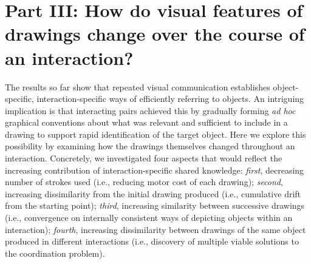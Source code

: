 \documentclass[10pt,letterpaper]{article}
\begin{document}






\section{Part III: How do visual features of drawings change over the course of an interaction?}

The results so far show that repeated visual communication establishes object-specific, interaction-specific ways of efficiently referring to objects.
An intriguing implication is that interacting pairs achieved this by gradually forming \textit{ad hoc} graphical conventions about what was relevant and sufficient to include in a drawing to support rapid identification of the target object.
Here we explore this possibility by examining how the drawings themselves changed throughout an interaction.
Concretely, we investigated four aspects that would reflect the increasing contribution of interaction-specific shared knowledge:
\textit{first}, decreasing number of strokes used (i.e., reducing motor cost of each drawing);
\textit{second}, increasing dissimilarity from the initial drawing produced (i.e., cumulative drift from the starting point);
\textit{third}, increasing similarity between successive drawings (i.e., convergence on internally consistent ways of depicting objects within an interaction);
\textit{fourth}, increasing dissimilarity between drawings of the same object produced in different interactions (i.e., discovery of multiple viable solutions to the coordination problem).
\end{document}
